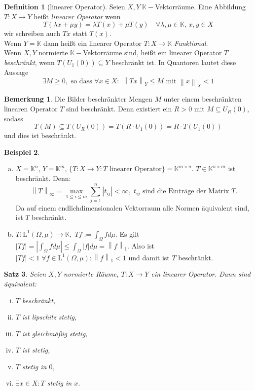 \documentclass[ngerman]{report}
\theoremstyle{plain}%
\newtheorem{thm}{Satz}[chapter]
\theoremstyle{definition}%
\newtheorem{definition}[thm]{Definition}
\newtheorem{bsp}[thm]{Beispiel}
\theoremstyle{myStyle}
\newtheorem*{bem*}{Bemerkung}
\newcommand{\C}{\mathbb{C}}
\newcommand{\R}{\mathbb{R}}
\newcommand{\K}{\mathbb{K}}
\newcommand{\lL}[2][\Omega,\mu]{\text{L}^{#2}(#1)} %
\newcommand{\norm}[1]{\left \|#1\right\| }
\newcommand{\intl}[1]{\int_\Omega #1 d\mu} %
\begin{document}
	\begin{definition}[linearer Operator]
		Seien $X,Y\; \K-$Vektorräume. Eine Abbildung $T:X\rightarrow Y$ heißt \textit{linearer Operator} wenn 
		$$T(\lambda x+\mu y) = \lambda T(x) + \mu T(y)\quad \forall \lambda,\mu \in \K,\,x,y\in X$$ 
		wir schreiben auch $Tx$ statt $T(x)$.\\
		Wenn $Y=\K$ dann heißt ein linearer Operator $T:X\rightarrow \K$\textit{ Funktional}.\\
		Wenn $X,Y$ normierte $\K-$Vektorräume sind, heißt ein linearer Operator $T$ \textit{beschränkt}, wenn $T(U_1(0)) \subseteq Y$ beschränkt ist. In Quantoren lautet diese Aussage
			$$ \exists M \geq 0, \text{ so dass } \forall x\in X :\; \norm{Tx}_Y \leq M \text{ mit } \norm{x}_X < 1$$
	\end{definition}
	\begin{bem*} 
	Die Bilder beschränkter Mengen $M$ unter einem beschränkten linearen Operator $T$ sind beschränkt. Denn existiert ein $R>0$ mit $M \subseteq  U_R(0)$, sodass 
		$$T(M) \subseteq T(U_R(0))=T(R\cdot U_1(0))=R\cdot T(U_1(0))$$
		und dies ist beschränkt.
	\end{bem*}

	\begin{bsp}
		\begin{enumerate}[a)]
			\item $X = \K^n$, $Y = \K^m$, $\{T: X\to Y: T \text{ linearer Operator}\} = \K^{m \times n}.$ $T\in\K^{n \times m}$ ist beschränkt. 
			Denn: 
			$$\norm{T}_\infty = \max_{1\leq i \leq m} \sum^n_{j=1} |t_{ij}| < \infty,\; t_{ij} \text{ sind die Einträge der Matrix }T.$$ Da auf einem endlichdimensionalen Vektorraum alle Normen äquivalent sind, ist $T$ beschränkt.
			\item $T: \lL{1} \to \K, \; Tf := \intl{f}.$ 
				Es gilt $|Tf| = |\intl{f}| \leq \intl{|f|} = \norm{f}_1.$
				Also ist $|Tf| < 1 \; \forall f \in \lL{1}: \norm{f}_1 < 1$ und damit ist $T$ beschränkt.
		\end{enumerate}
	\end{bsp}

	\begin{thm}
		Seien $X,Y$ normierte Räume, $T: X\to Y$ ein linearer Operator. Dann sind äquivalent:
			\begin{enumerate}[(i)]
				\item $T$ beschränkt,
				\item $T$ ist lipschitz stetig,
				\item $T$ ist gleichmäßig stetig,
				\item $T$ ist stetig,
				\item $T$ stetig in $0$,
				\item $\exists x \in X: T$ stetig in $x$.
			\end{enumerate}
	\end{thm}
\end{document}
